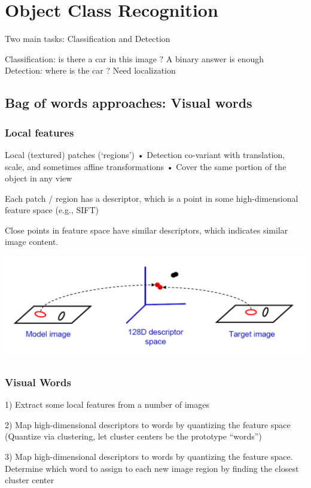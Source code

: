 \section{Object Class Recognition}

Two main tasks: Classification and Detection

Classification: is there a car in this image ? A binary answer is enough\\
Detection: where is the car ? Need localization

\subsection{Bag of words approaches: Visual words}
\subsubsection{Local features}
Local (textured) patches (‘regions’) • Detection co-variant with translation, scale, and sometimes affine transformations
• Cover the same portion of the object in any view



Each patch / region has a descriptor, which is a point in some high-dimensional feature space (e.g., SIFT)

Close points in feature space have similar descriptors, which indicates similar image content.

\includegraphics[width=\columnwidth]{pictures/localfeature}

\subsubsection{Visual Words}
1) Extract some local features from a number of images

2) Map high-dimensional descriptors to words by quantizing the feature space (Quantize via clustering, let cluster centers be the prototype “words”)

3) Map high-dimensional descriptors to words by quantizing the feature space. Determine which word to assign to each new image region by finding the closest cluster center

